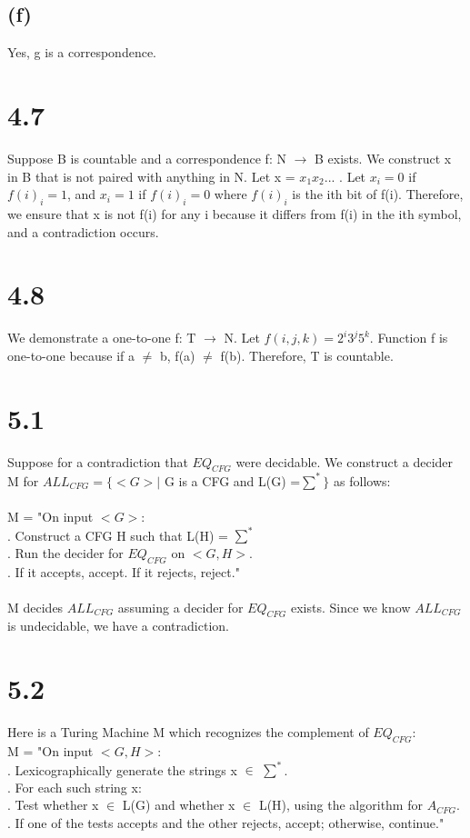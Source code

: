 \documentclass{scrartcl}
\begin{document}
\subsection*{(f)}
Yes, g is a correspondence.

\section*{4.7}
Suppose B is countable and a correspondence f: N $\to$ B exists. We construct x in B that is not paired with anything in N. Let x = $x_1x_2$... . Let $x_i = 0$ if $f(i)_i = 1$, and $x_i = 1$ if $f(i)_i = 0$ where $f(i)_i$ is the ith bit of f(i). Therefore, we ensure that x is not f(i) for any i because it differs from f(i) in the ith symbol, and a contradiction occurs.
\section*{4.8}
We demonstrate a one-to-one f: T $\to$ N. Let $f(i,j,k)=2^i3^j5^k$. Function  f is one-to-one because if a $\neq$ b, f(a) $\neq$ f(b). Therefore, T is countable.

\section*{5.1}
Suppose for a contradiction that $EQ_{CFG}$ were decidable. We construct a decider M for $ALL_{CFG} = \{<G> \mid$ G is a CFG and L(G) =$ \sum^*\}$ as follows:\\
\\
M = "On input $<G>$:\\
. Construct a CFG H such that L(H) = $\sum^*$\\
. Run the decider for $EQ_{CFG}$ on $<G,H>$.\\
. If it accepts, accept. If it rejects, reject."\\
\\
M decides $ALL_{CFG}$ assuming a decider for $EQ_{CFG}$ exists. Since we know $ALL_{CFG}$ is undecidable, we have a contradiction.

\section*{5.2}
Here is a Turing Machine M which recognizes the complement of $EQ_{CFG}$:\\
M = "On input $<G,H>$:\\
. Lexicographically generate the strings x $\in$ $\sum^*$.\\
. For each such string x:\\
. \qquad Test whether x $\in$ L(G) and whether x $\in$ L(H), using the algorithm for $A_{CFG}$.\\
. \qquad If one of the tests accepts and the other rejects, accept; otherwise, continue."
\end{document}
